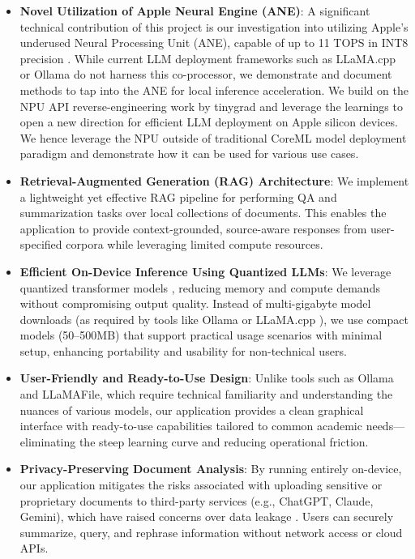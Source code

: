 \begin{itemize}
    
    \item \textbf{Novel Utilization of Apple Neural Engine (ANE)}: A significant technical contribution of this project is our investigation into utilizing Apple’s underused Neural Processing Unit (ANE), capable of up to 11 TOPS in INT8 precision \cite{apple2024ane}. While current LLM deployment frameworks such as LLaMA.cpp \cite{llamacpp2023} or Ollama\cite{ollama2023} do not harness this co-processor, we demonstrate and document methods to tap into the ANE for local inference acceleration. We build on the NPU API reverse-engineering work by tinygrad \cite{tinygrad2023ane} and leverage the learnings to open a new direction for efficient LLM deployment on Apple silicon devices. We hence leverage the NPU outside of traditional CoreML model deployment paradigm and demonstrate how it can be used for various use cases.

    \item \textbf{Retrieval-Augmented Generation (RAG) Architecture}: We implement a lightweight yet effective RAG pipeline \cite{lewis2020rag} for performing QA and summarization tasks over local collections of documents. This enables the application to provide context-grounded, source-aware responses from user-specified corpora while leveraging limited compute resources.

    \item \textbf{Efficient On-Device Inference Using Quantized LLMs}: We leverage quantized transformer models \cite{jacob2017quantization}, reducing memory and compute demands without compromising output quality. Instead of multi-gigabyte model downloads (as required by tools like Ollama \cite{ollama2023} or LLaMA.cpp \cite{llamacpp2023}), we use compact models (50–500MB) that support practical usage scenarios with minimal setup, enhancing portability and usability for non-technical users.

    \item \textbf{User-Friendly and Ready-to-Use Design}: Unlike tools such as Ollama \cite{ollama2023} and LLaMAFile\cite{llamafile2023}, which require technical familiarity and understanding the nuances of various models, our application provides a clean graphical interface with ready-to-use capabilities tailored to common academic needs—eliminating the steep learning curve and reducing operational friction.
    
    \item \textbf{Privacy-Preserving Document Analysis}: By running entirely on-device, our application mitigates the risks associated with uploading sensitive or proprietary documents to third-party services (e.g., ChatGPT, Claude, Gemini), which have raised concerns over data leakage \cite{mattern2023membership,nasr2023extraction}. Users can securely summarize, query, and rephrase information without network access or cloud APIs.

\end{itemize}

